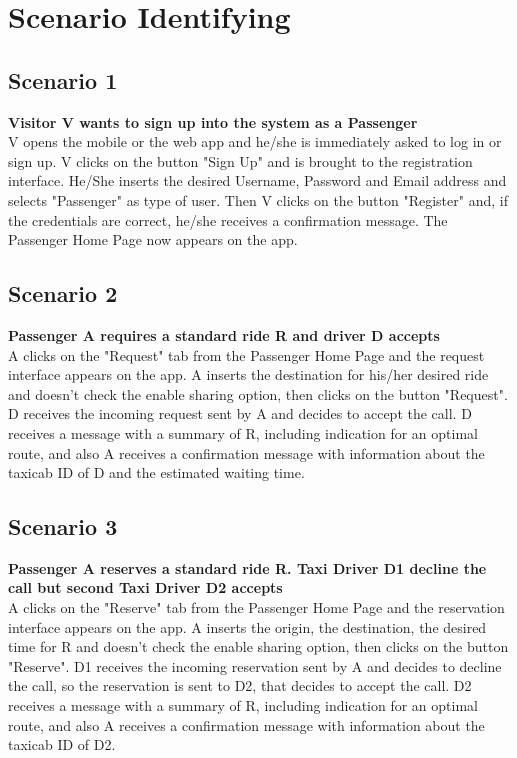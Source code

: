 \chapter{Scenario Identifying} \label{chap4}

\section{Scenario 1}
\textbf {Visitor V wants to sign up into the system as a Passenger} \\
V opens the mobile or the web app and he/she is immediately asked to log in or sign up. V clicks on the button "Sign Up" and is brought to the registration interface. He/She inserts the desired Username, Password and Email address and selects "Passenger" as type of user. Then V clicks on the button "Register" and, if the credentials are correct, he/she receives a confirmation message. The Passenger Home Page now appears on the app.

\section{Scenario 2}
\textbf{Passenger A requires a standard ride R and driver D accepts} \\
A clicks on the "Request" tab from the Passenger Home Page and the request interface appears on the app. A inserts the destination for his/her desired ride and doesn't check the enable sharing option, then clicks on the button "Request". D receives the incoming request sent by A and decides to accept the call. D receives a message with a summary of R, including indication for an optimal route, and also A receives a confirmation message with information about the taxicab ID of D and the estimated waiting time. 

\section{Scenario 3}
\textbf{Passenger A reserves a standard ride R. Taxi Driver D1 decline the call but second Taxi Driver D2 accepts} \\
A clicks on the "Reserve" tab from the Passenger Home Page and the reservation interface appears on the app. A inserts the origin, the destination, the desired time for R and doesn't check the enable sharing option, then clicks on the button "Reserve". D1 receives the incoming reservation sent by A and decides to decline the call, so the reservation is sent to D2, that decides to accept the call. D2 receives a message with a summary of R, including indication for an optimal route, and also A receives a confirmation message with information about the taxicab ID of D2.


